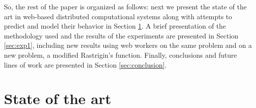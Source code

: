 \documentclass{sig-alternate}
\begin{document}

So, the rest of the paper is organized as follows: next we present the
state of the art in web-based distributed
computational systems along with attempts to predict and model their
behavior in Section \ref{sec:soa}. A brief presentation of the
methodology used and the results of the experiments are presented in
Section \ref{sec:exp1}, including new results using web workers on the
same problem and on a new problem, a modified Rastrigin's function. 
Finally, conclusions and future lines of work are presented in Section
\ref{sec:conclusion}. 

\section{State of the art}
\label{sec:soa}
\end{document}
